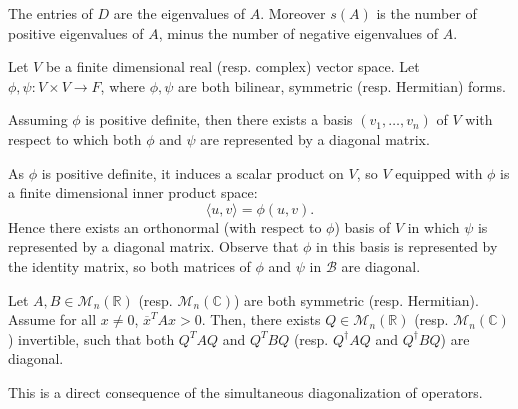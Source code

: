 \documentclass[12pt]{article}
\begin{document}
\begin{remark}
	The entries of $D$ are the eigenvalues of $A$. Moreover $s(A)$ is the number of positive eigenvalues of $A$, minus the number of negative eigenvalues of $A$.
\end{remark}

\begin{corollary}
	Let $V$ be a finite dimensional real (resp. complex) vector space. Let $\phi, \psi : V \times V \to F$, where $\phi, \psi$ are both bilinear, symmetric (resp. Hermitian) forms.

	Assuming $\phi$ is positive definite, then there exists a basis $(v_1, \ldots, v_n)$ of $V$ with respect to which both $\phi$ and $\psi$ are represented by a diagonal matrix.
\end{corollary}

\begin{proofbox}
	As $\phi$ is positive definite, it induces a scalar product on $V$, so $V$ equipped with $\phi$ is a finite dimensional inner product space:
	\[
	\langle u, v \rangle = \phi(u, v)
	.\]
	Hence there exists an orthonormal (with respect to $\phi$) basis of $V$ in which $\psi$ is represented by a diagonal matrix. Observe that $\phi$ in this basis is represented by the identity matrix, so both matrices of $\phi$ and $\psi$ in $\mathcal{B}$ are diagonal.
\end{proofbox}

\begin{corollary}
	Let $A, B \in \mathcal{M}_n(\mathbb{R})$ (resp. $\mathcal{M}_n(\mathbb{C})$) are both symmetric (resp. Hermitian). Assume for all $x \neq 0$, $\overline{x}^{T} A x > 0$. Then, there exists $Q \in \mathcal{M}_n(\mathbb{R})$ (resp. $\mathcal{M}_n(\mathbb{C})$) invertible, such that both $Q^{T}AQ$ and $Q^{T}BQ$ (resp. $Q^{\dagger}AQ$ and $Q^{\dagger}BQ$) are diagonal.
\end{corollary}

This is a direct consequence of the simultaneous diagonalization of operators.

\newpage

\printindex
\end{document}
